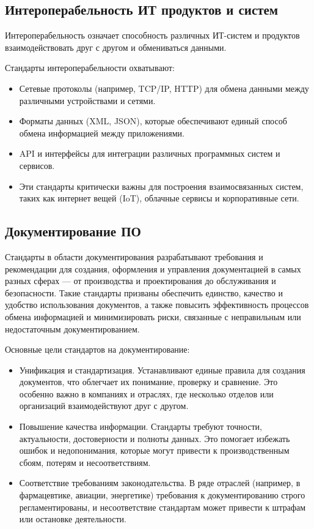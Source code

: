 \subsection{Интероперабельность ИТ продуктов и систем}

Интероперабельность означает способность различных ИТ-систем
и продуктов взаимодействовать друг с другом и обмениваться данными.

Стандарты интероперабельности охватывают:

\begin{itemize}
    \item Сетевые протоколы (например, TCP/IP, HTTP)
    для обмена данными между различными устройствами и сетями.
    \item Форматы данных (XML, JSON),
    которые обеспечивают единый способ обмена информацией
    между приложениями.
    \item API и интерфейсы для интеграции различных программных систем
    и сервисов.
    \item Эти стандарты критически важны для построения взаимосвязанных систем,
    таких как интернет вещей (IoT), облачные сервисы и корпоративные сети.
\end{itemize}

\subsection{Документирование ПО}

Стандарты в области документирования разрабатывают требования
и рекомендации для создания, оформления
и управления документацией в самых разных сферах --- от производства
и проектирования до обслуживания и безопасности.
Такие стандарты призваны обеспечить единство,
качество и удобство использования документов,
а также повысить эффективность процессов обмена информацией
и минимизировать риски,
связанные с неправильным или недостаточным документированием.

Основные цели стандартов на документирование:

\begin{itemize}
    \item Унификация и стандартизация.
    Устанавливают единые правила для создания документов,
    что облегчает их понимание, проверку и сравнение.
    Это особенно важно в компаниях и отраслях,
    где несколько отделов или организаций взаимодействуют друг с другом.
    \item Повышение качества информации.
    Стандарты требуют точности, актуальности,
    достоверности и полноты данных.
    Это помогает избежать ошибок и недопонимания,
    которые могут привести к производственным сбоям,
    потерям и несоответствиям.
    \item Соответствие требованиям законодательства.
    В ряде отраслей (например, в фармацевтике, авиации, энергетике)
    требования к документированию строго регламентированы,
    и несоответствие стандартам может привести к штрафам
    или остановке деятельности.
\end{itemize}
